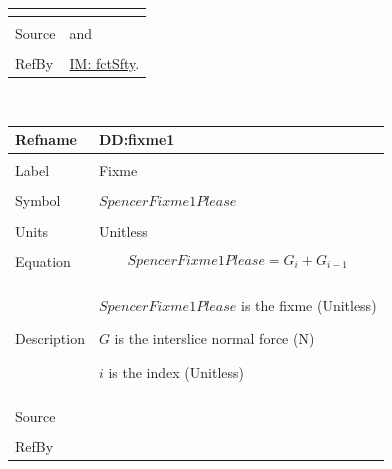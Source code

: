 \documentclass[12pt]{article}
\begin{document}
\begin{minipage}{\textwidth}
\begin{tabular}{p{} p{}}
\begin{symbDescription}
                                                  \end{symbDescription}
                                                  \\ \midrule \\
                                                  Source & \cite{chen2005} and \cite{karchewski2012}
                                                           \\ \midrule \\
                                                           RefBy & \hyperref[IM:fctSfty]{IM: fctSfty}.
\\ \bottomrule \end{tabular}
\end{minipage}
\par~

\noindent \begin{minipage}{\textwidth}
\begin{tabular}{p{} p{}}
\toprule \textbf{Refname} & \textbf{DD:fixme1}
\label{DD:fixme1}
\\ \midrule \\
Label & Fixme
        \\ \midrule \\
        Symbol & $SpencerFixme1Please$
                 \\ \midrule \\
                 Units & Unitless
                         \\ \midrule \\
                         Equation & \begin{displaymath}
                                    SpencerFixme1Please=G_{i}+G_{i-1}
                                    \end{displaymath}
                                    \\ \midrule \\
                                    Description & \begin{symbDescription}
                                                  \item{$SpencerFixme1Please$ is the fixme (Unitless)}
                                                  \item{$G$ is the interslice normal force (N)}
                                                  \item{$i$ is the index (Unitless)}
                                                  \end{symbDescription}
                                                  \\ \midrule \\
                                                  Source & \\ \midrule \\
                                                           RefBy & 
\\ \bottomrule \end{tabular}
\end{minipage}
\par~
\end{document}
